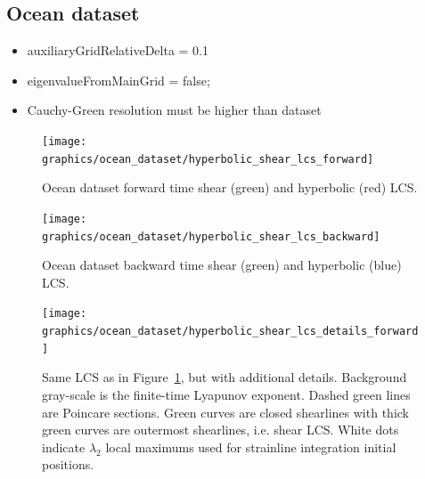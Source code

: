 \documentclass{article}
\begin{document}
\subsection{Ocean dataset}

\begin{itemize}
\item auxiliaryGridRelativeDelta = 0.1
\item eigenvalueFromMainGrid = false;
\item Cauchy-Green resolution must be higher than dataset
\end{itemize}

\begin{figure}
\begin{center}
\texttt{[image: graphics/ocean\_dataset/hyperbolic\_shear\_lcs\_forward]}
\end{center}
\caption{Ocean dataset forward time shear (green) and hyperbolic (red) LCS.}
\label{f:ocean dataset hyperbolic shear lcs forward}
\end{figure}

\begin{figure}
\begin{center}
\texttt{[image: graphics/ocean\_dataset/hyperbolic\_shear\_lcs\_backward]}
\end{center}
\caption{Ocean dataset backward time shear (green) and hyperbolic (blue) LCS.}
\label{f:ocean dataset hyperbolic shear lcs backward}
\end{figure}

\begin{figure}
\begin{center}
\texttt{[image: graphics/ocean\_dataset/hyperbolic\_shear\_lcs\_details\_forward]}
\end{center}
\caption{Same LCS as in Figure~\ref{f:ocean dataset hyperbolic shear lcs forward}, but with additional details. Background gray-scale is the finite-time Lyapunov exponent. Dashed green lines are Poincare sections. Green curves are closed shearlines with thick green curves are outermost shearlines, i.e. shear LCS. White dots indicate $\lambda_2$ local maximums used for strainline integration initial positions.}
\label{f:ocean dataset hyperbolic shear lcs details forward}
\end{figure}
\end{document}
